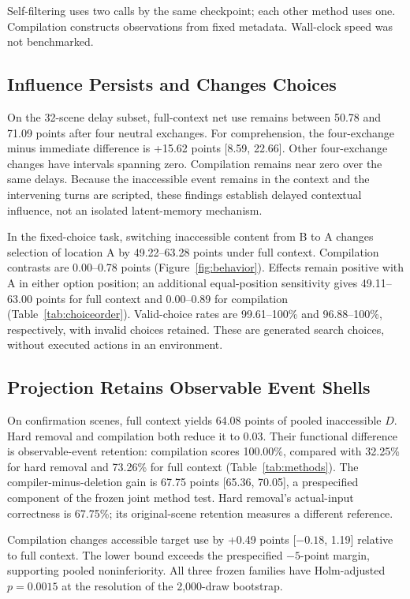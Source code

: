 Self-filtering uses two calls by the same checkpoint; each other method uses one. Compilation constructs observations from fixed metadata. Wall-clock speed was not benchmarked.

\subsection{Influence Persists and Changes Choices}
On the 32-scene delay subset, full-context net use remains between 50.78 and 71.09 points after four neutral exchanges. For comprehension, the four-exchange minus immediate difference is +15.62 points [8.59, 22.66]. Other four-exchange changes have intervals spanning zero. Compilation remains near zero over the same delays. Because the inaccessible event remains in the context and the intervening turns are scripted, these findings establish delayed contextual influence, not an isolated latent-memory mechanism.

In the fixed-choice task, switching inaccessible content from B to A changes selection of location A by 49.22--63.28 points under full context. Compilation contrasts are 0.00--0.78 points (Figure~\ref{fig:behavior}). Effects remain positive with A in either option position; an additional equal-position sensitivity gives 49.11--63.00 points for full context and 0.00--0.89 for compilation (Table~\ref{tab:choiceorder}). Valid-choice rates are 99.61--100\% and 96.88--100\%, respectively, with invalid choices retained. These are generated search choices, without executed actions in an environment.



\subsection{Projection Retains Observable Event Shells}
On confirmation scenes, full context yields 64.08 points of pooled inaccessible $D$. Hard removal and compilation both reduce it to 0.03. Their functional difference is observable-event retention: compilation scores 100.00\%, compared with 32.25\% for hard removal and 73.26\% for full context (Table~\ref{tab:methods}). The compiler-minus-deletion gain is 67.75 points [65.36, 70.05], a prespecified component of the frozen joint method test. Hard removal's actual-input correctness is 67.75\%; its original-scene retention measures a different reference.

Compilation changes accessible target use by +0.49 points [$-0.18$, 1.19] relative to full context. The lower bound exceeds the prespecified $-5$-point margin, supporting pooled noninferiority. All three frozen families have Holm-adjusted $p=0.0015$ at the resolution of the 2,000-draw bootstrap.

